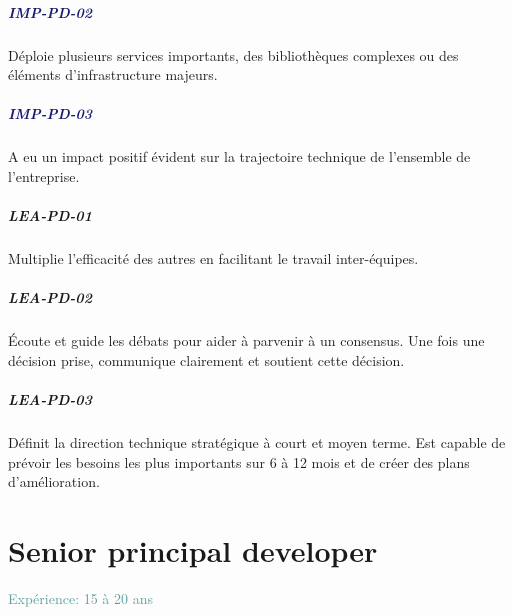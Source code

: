 \documentclass[a4paper, french, openany, 12pt]{book}
\newcommand\wis[1]{\textcolor{MidnightBlue}{\textbf{\uppercase{imp-{#1}}}}}
\newcommand\cha[1]{\textcolor{OliveGreen}{\textbf{\uppercase{lea-{#1}}}}}
\newcommand\xp[1]{\textcolor{CadetBlue}{Expérience: {#1} ans}}
\begin{document}
\begin{multicols}{2}
  \paragraph*{\wis{pd-02}}

  Déploie plusieurs services importants, des bibliothèques complexes ou des éléments d'infrastructure majeurs.

  \paragraph*{\wis{pd-03}}

  A eu un impact positif évident sur la trajectoire technique de l'ensemble de l'entreprise.

  \paragraph*{\cha{pd-01}}

  Multiplie l'efficacité des autres en facilitant le travail inter-équipes.

  \paragraph*{\cha{pd-02}}

  Écoute et guide les débats pour aider à parvenir à un consensus.
  Une fois une décision prise, communique clairement et soutient cette décision.

  \paragraph*{\cha{pd-03}}

  Définit la direction technique stratégique à court et moyen terme.
  Est capable de prévoir les besoins les plus importants  sur 6 à 12 mois et de créer des plans d'amélioration.

\end{multicols}

\chapter{Senior principal developer}

\xp{15 à 20}
\end{document}
